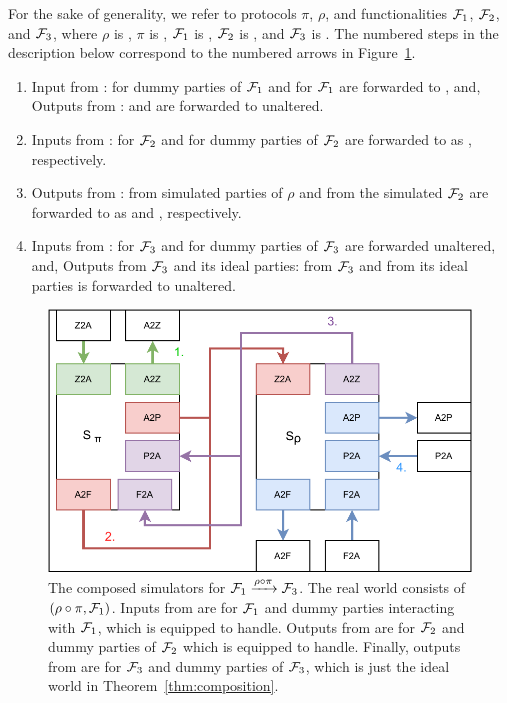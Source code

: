 For the sake of generality, we refer to protocols $\pi$, $\rho$, and functionalities $\mathcal{F}_1$, $\mathcal{F}_2$, and $\mathcal{F}_3$, where $\rho$ is , $\pi$ is , $\mathcal{F}_1$ is \Fro, $\mathcal{F}_2$ is \Fcom, and $\mathcal{F}_3$ is \Fflip.
The numbered steps in the description below correspond to the numbered arrows in Figure~\ref{fig:simcomp}.
\begin{enumerate}
\item Input from \Z:  for dummy parties of $\mathcal{F}_1$ and  for $\mathcal{F}_1$  are forwarded to \SIM{\pi}, and, Outputs from \SIM{\pi}:  and  are forwarded to \Z unaltered.
\item Inputs from \SIM{\pi}:  for $\mathcal{F}_2$ and  for dummy parties of $\mathcal{F}_2$ are forwarded to \SIM{\rho} as  , respectively.
\item Outputs from \SIM{\rho}:  from simulated parties of $\rho$  and  from the simulated $\mathcal{F}_2$ are forwarded to \SIM{\pi} as  and , respectively.
\item Inputs from \SIM{\rho}:  for $\mathcal{F}_3$ and  for dummy parties of $\mathcal{F}_3$ are forwarded unaltered, and, Outputs from $\mathcal{F}_3$ and its ideal parties:  from $\mathcal{F}_3$ and  from its ideal parties is forwarded to \SIM{\rho} unaltered.
\end{enumerate}

\begin{figure}
\centering
\includegraphics[scale=0.62]{figures/simcomp.pdf}
\caption{The composed simulators for $\mathcal{F}_1 \xrightarrow{\rho \circ \pi} \mathcal{F}_3$. The real world consists of $(\rho \circ \pi, \mathcal{F}_1)$. Inputs from \Z are for $\mathcal{F}_1$ and dummy parties interacting with $\mathcal{F}_1$, which \SIM{\pi} is equipped to handle. Outputs from \SIM{\pi} are for $\mathcal{F}_2$ and dummy parties of $\mathcal{F}_2$ which \SIM{\rho} is equipped to handle. Finally, outputs from \SIM{\rho} are for $\mathcal{F}_3$ and dummy parties of $\mathcal{F}_3$, which is just the ideal world in Theorem~\ref{thm:composition}.}
\label{fig:simcomp}
\end{figure}

